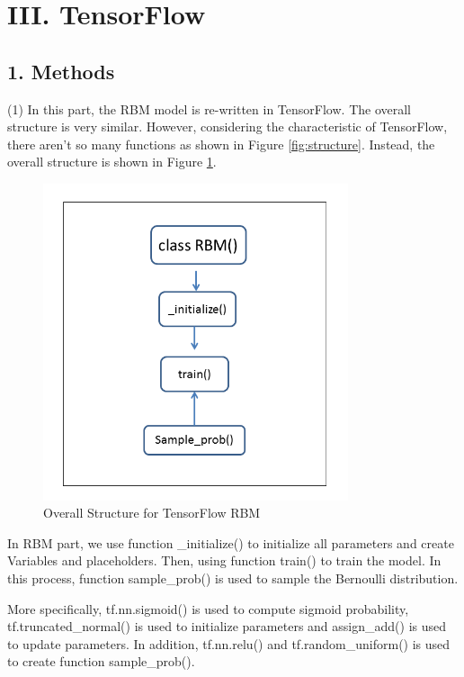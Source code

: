 \newpage
\section*{\Large III. TensorFlow}

\subsection*{\large 1. Methods}

(1) In this part, the RBM model is re-written in TensorFlow. The overall structure is very similar. However, considering the characteristic of TensorFlow, there aren't so many functions as shown in Figure \ref{fig:structure}. Instead, the overall structure is shown in Figure \ref{fig:tf_structure}.

\begin{figure}[H]
\centering
\includegraphics[width=0.8\textwidth]{./figures/ECE544hw4(2).png}
\caption{\label{fig:tf_structure} Overall Structure for TensorFlow RBM}
\end{figure}

In RBM part, we use function \_initialize() to initialize all parameters and create Variables and placeholders. Then, using function train() to train the model. In this process, function sample\_prob() is used to sample the Bernoulli distribution. 

More specifically, tf.nn.sigmoid() is used to compute sigmoid probability, tf.truncated\_normal() is used to initialize parameters and assign\_add() is used to update parameters. In addition, tf.nn.relu() and tf.random\_uniform() is used to create function sample\_prob(). \\

